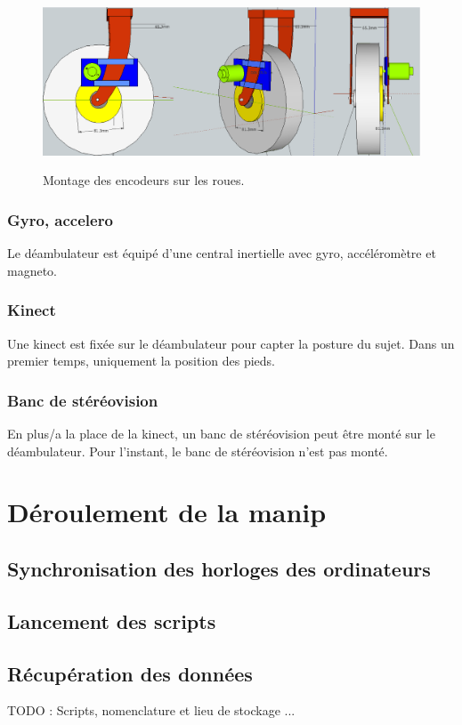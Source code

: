\documentclass[a4paper, 10pt ]{article}
\begin{document}
\begin{figure}
\includegraphics[width=0.8\columnwidth]{images/encodeur.eps}
\label{fig:encodeur}
\caption{Montage des encodeurs sur les roues.}
\end{figure}

\subsubsection{Gyro, accelero}

Le déambulateur est équipé d'une central inertielle avec gyro, accéléromètre et magneto.

\subsubsection{Kinect}

Une kinect est fixée sur le déambulateur pour capter la posture du sujet. Dans un premier temps, uniquement la position des pieds.

\subsubsection{Banc de stéréovision}

En plus/a la place de la kinect, un banc de stéréovision peut être monté sur le déambulateur.
Pour l'instant, le banc de stéréovision n'est pas monté.

\section{Déroulement de la manip}

\subsection{Synchronisation des horloges des ordinateurs}

\subsection{Lancement des scripts}

\subsection{Récupération des données}

TODO : Scripts, nomenclature et lieu de stockage ...


 

\end{document}
